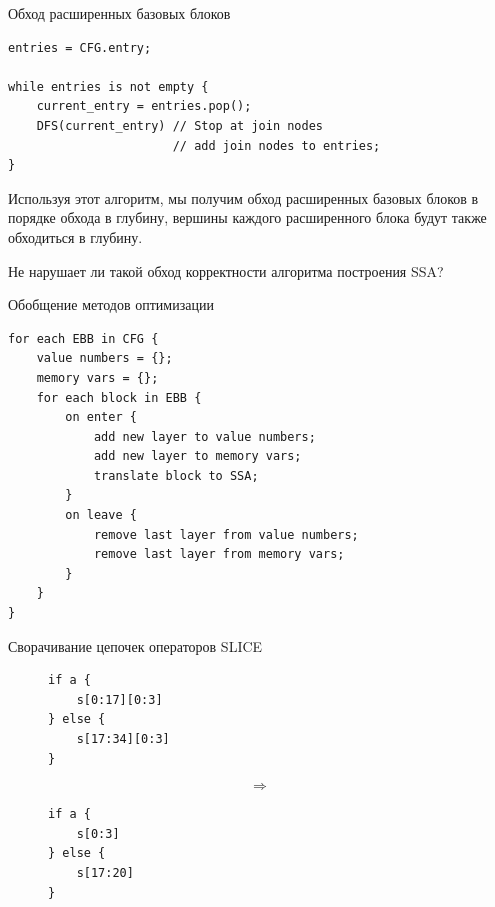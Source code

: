 \documentclass[presentation]{beamer}
\begin{document}
\begin{frame}[label={sec:orgb1116fc},fragile]{Обход расширенных базовых блоков}
 \begin{verbatim}
entries = CFG.entry;

while entries is not empty {
    current_entry = entries.pop();
    DFS(current_entry) // Stop at join nodes
                       // add join nodes to entries;
}
\end{verbatim}

Используя этот алгоритм, мы получим обход расширенных базовых блоков в порядке обхода в глубину, вершины каждого расширенного блока будут также обходиться в глубину.

\alert{Не нарушает ли такой обход корректности алгоритма построения SSA?}
\end{frame}
\begin{frame}[label={sec:org9481d54},fragile]{Обобщение методов оптимизации}
 \begin{verbatim}
for each EBB in CFG {
    value numbers = {};
    memory vars = {};
    for each block in EBB {
        on enter {
            add new layer to value numbers;
            add new layer to memory vars;
            translate block to SSA;
        }
        on leave {
            remove last layer from value numbers;
            remove last layer from memory vars;
        }
    }
}   
\end{verbatim}
\end{frame}
\begin{frame}[label={sec:org329ef1e},fragile]{Сворачивание цепочек операторов SLICE}
 \begin{figure}
\begin{minipage}[t]{0.4\textwidth}
\begin{verbatim}
if a {
    s[0:17][0:3]
} else {
    s[17:34][0:3]
}
\end{verbatim}
\end{minipage}%
\begin{minipage}[t]{0.2\textwidth}
$$\Longrightarrow$$
\end{minipage}%
\begin{minipage}[t]{0.4\textwidth}
\begin{verbatim}
if a {
    s[0:3]
} else {
    s[17:20]
}
\end{verbatim}
\end{minipage}
\end{figure}
\end{frame}
\end{document}
